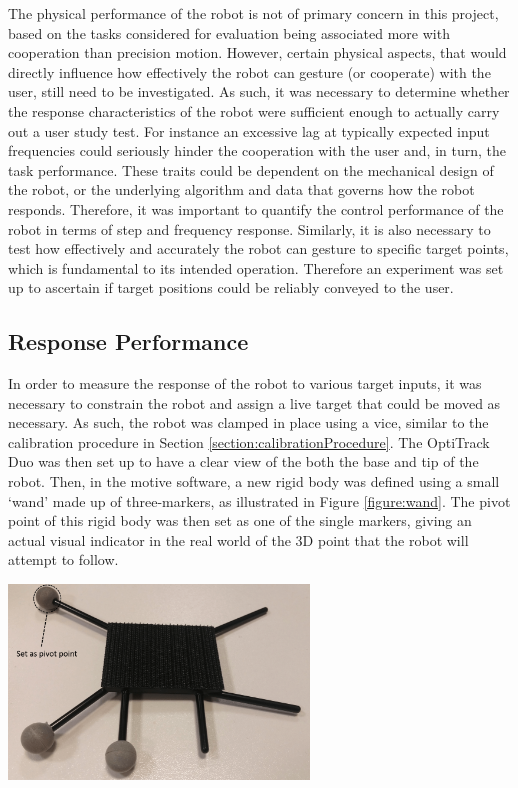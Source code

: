 \documentclass[11pt]{article}
\begin{document}
The physical performance of the robot is not of primary concern in this project, based on the tasks considered for evaluation being associated more with cooperation than precision motion. However, certain physical aspects, that would directly influence how effectively the robot can gesture (or cooperate) with the user, still need to be investigated. As such, it was necessary to determine whether the response characteristics of the robot were sufficient enough to actually carry out a user study test. For instance an excessive lag at typically expected input frequencies could seriously hinder the cooperation with the user and, in turn, the task performance. These traits could be dependent on the mechanical design of the robot, or the underlying algorithm and data that governs how the robot responds. Therefore, it was important to quantify the control performance of the robot in terms of step and frequency response. Similarly, it is also necessary to test how effectively and accurately the robot can gesture to specific target points, which is fundamental to its intended operation. Therefore an experiment was set up to ascertain if target positions could be reliably conveyed to the user. 


\subsection{Response Performance}
In order to measure the response of the robot to various target inputs, it was necessary to constrain the robot and assign a live target that could be moved as necessary. As such, the robot was clamped in place using a vice, similar to the calibration procedure in Section \ref{section:calibrationProcedure}. The OptiTrack Duo was then set up to have a clear view of the both the base and tip of the robot. Then, in the motive software, a new rigid body was defined using a small `wand' made up of three-markers, as illustrated in Figure \ref{figure:wand}. The pivot point of this rigid body was then set as one of the single markers, giving an actual visual indicator in the real world of the 3D point that the robot will attempt to follow.

\begin{center}
\includegraphics[width=0.6\textwidth]{images/wand.png}
\label{figure:wand}
\end{center}
\end{document}
